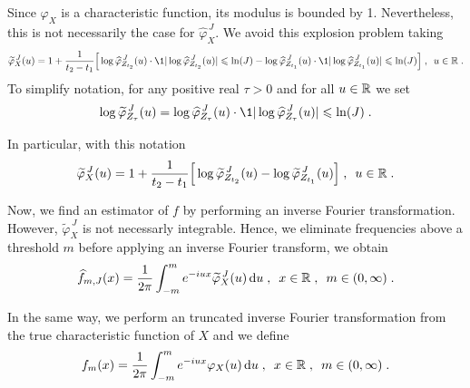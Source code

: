 Since $\varphi_X$ is a characteristic function, its modulus is bounded by 1. Nevertheless, this is not necessarily the case for $\hat \varphi_X^{\, J}$. We avoid this explosion problem taking
    \begin{equation*}
        \tilde \varphi_X^{\, J} (u) 
        = 1 + \frac{1}{t_2 - t_1} \Bc{ \log \hat \varphi_{Z_{t_2}}^{\, J} (u) \cdot \1{|\log 		   
        \hat \varphi_{Z_{t_2}}^{\, J} (u)| \leq \ln(J)} - \log 		   
        \hat \varphi_{Z_{t_1}}^{\, J} (u) \cdot \1{|\log 		   
        \hat \varphi_{Z_{t_1}}^{\, J} (u)| \leq \ln(J)}}
        \eqsepv
        u \in \RR
        \eqfinp
    \end{equation*}
To simplify notation, for any positive real $\tau > 0$ and for all $u \in \mathbb{R}$ we set
    \begin{equation*}
    \log \tilde \varphi_{Z_{\tau}}^{\, J}  (u) 
    =
    \log \hat \varphi_{Z_{\tau}}^{\, J} (u) \cdot \1{|\log 		   
        \hat \varphi_{Z_{\tau}}^{\, J} (u)| \leq \ln(J)}
    \eqfinp
    \end{equation*}

In particular, with this notation
    \begin{equation}
    \label{def:estimateur_fctcar_tilde}
        \widetilde \varphi_X^{\, J} (u) 
        = 1 + \frac{1}{t_2 - t_1} \Big[ \log \widetilde \varphi_{Z_{t_2}}^{\, J} (u) - \log 		   
        \widetilde \varphi_{Z_{t_1}}^{\, J} (u) \Big]
        \; , \enspace
        u \in \mathbb{R}
        \; .
    \end{equation}
    


Now, we find an estimator of $f$ by performing an inverse Fourier transformation. However, $\tilde \varphi_X^{\, J}$ is not necessarly integrable. Hence, we eliminate frequencies above a threshold $m$ before applying an inverse Fourier transform, we obtain
	\begin{equation}
        \widehat f_{m, J}(x) = \frac{1}{2\pi} \int_{-m}^m e^{-iux} \widetilde \varphi_X^{\, J} (u) \, \mathrm du
        \; , \enspace
        x \in \mathbb{R}
        \; , \enspace
        m \in (0, \infty)
        \; .
    \label{def:estimateur}
    \end{equation}

In the same way, we perform an truncated inverse Fourier transformation from the true characteristic function of $X$ and we define
	\begin{equation*}
        f_{m}(x) = \frac{1}{2\pi} \int_{-m}^m e^{-iux} \varphi_X (u) \, \mathrm du
        \; , \enspace
        x \in \mathbb{R}
        \; , \enspace m \in (0, \infty)
        \; .
    \label{def:true_estimateur_truncated}
    \end{equation*}

